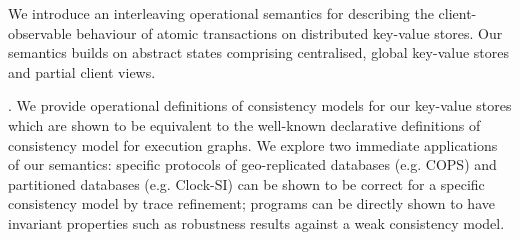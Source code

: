 
We introduce an interleaving operational semantics for describing the
client-observable behaviour of atomic transactions on distributed
key-value stores. Our semantics builds on abstract states comprising
centralised, global key-value stores and partial client views. 


.  We provide
operational definitions of consistency models for our key-value stores which
are shown to be equivalent to the well-known declarative definitions
of consistency model for execution graphs. We explore  two
immediate applications of our semantics: specific protocols of 
geo-replicated databases (e.g. COPS) and partitioned databases
(e.g. Clock-SI) can be shown to be correct for a specific consistency
model by trace refinement; %
programs can be directly shown to have invariant properties such as 
robustness results against a weak consistency model.
